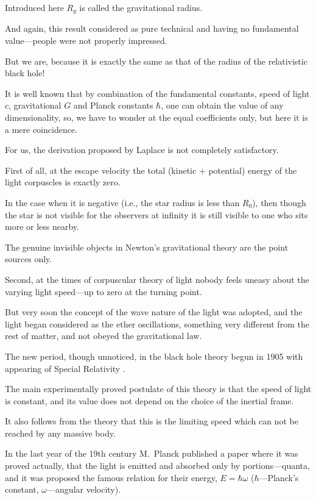 Introduced here $R_g$ is called the gravitational radius. 

And again, this result considered as pure technical and having no fundamental value---people were not properly impressed. 

But we are, because it is exactly the same as that of the radius of the relativistic black hole! 

It is well known that by combination of the fundamental constants, speed of light $c$, gravitational $G$ and Planck constants $\hbar$, one can obtain the value of any dimensionality, so, we have to wonder at the equal coefficients only, but here it is a mere coincidence. 

For us, the derivation proposed by Laplace is not completely satisfactory. 

First of all, at the escape velocity the total (kinetic + potential) energy of the light corpuscles is exactly zero. 

In the case when it is negative (i.e., the star radius is less than $R_0$), then though the star is not visible for the observers at infinity it is still visible to one who sits more or less nearby. 

The genuine invisible objects in Newton's gravitational theory are the point sources only. 

Second, at the times of corpuscular theory of light nobody feels uneasy about the varying light speed---up to zero at the turning point. 

But very soon the concept of the wave nature of the light was adopted, and the light began considered as the ether oscillations, something very different from the rest of matter, and not obeyed the gravitational law.



The new period, though unnoticed, in the black hole theory begun in 1905 with appearing of Special Relativity \cite{berez:E1}. 

The main experimentally proved postulate of this theory is that the speed of light is constant, and its value does not depend on the choice of the inertial frame. 

It also follows from the theory that this is the limiting speed which can not be reached by any massive body. 

In the last year of the 19th century M.~Planck published a paper where it was proved actually, that the light is emitted and absorbed only by portions---quanta, and it was proposed the famous relation for their energy, $E = \hbar \omega $ ($\hbar$---Planck's constant, $\omega$---angular velocity). 

